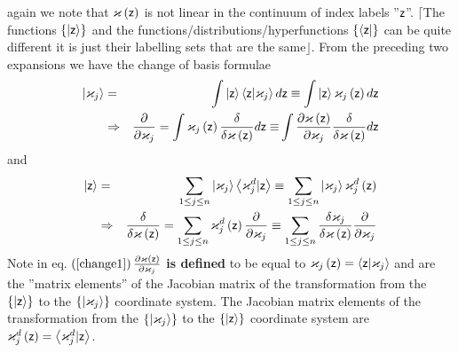 again we note that $\varkappa \left( {\sf z}\right) $ is not linear in the
continuum of index labels ''${\sf z}$''. $\lceil $The functions $\left\{
\left| {\sf z}\right\rangle \right\} $ and the
functions/distributions/hyperfunctions $\left\{ \left\langle {\sf z}\right|
\right\} $ can be quite different it is just their labelling sets that are
the same$\rfloor $. From the preceding two expansions we have the change of
basis formulae 
\begin{eqnarray}
\left| {\bf \varkappa }_{j}\right\rangle &=&\int \left| {\sf z}\right\rangle
\left\langle {\sf z}|{\bf \varkappa }_{j}\right\rangle d{\sf z}\equiv \int
\left| {\sf z}\right\rangle \varkappa _{j}\left( {\sf z}\right) d{\sf z} 
\nonumber \\
&\Rightarrow &\frac{\partial }{\partial \varkappa _{j}}=\int \varkappa
_{j}\left( {\sf z}\right) \frac{\delta }{\delta \varkappa \left( {\sf z}%
\right) }d{\sf z\equiv }\int \frac{\partial \varkappa \left( {\sf z}\right) 
}{\partial \varkappa _{j}}\frac{\delta }{\delta \varkappa \left( {\sf z}%
\right) }d{\sf z}  \label{change1}
\end{eqnarray}%
and%
\begin{eqnarray}
\left| {\sf z}\right\rangle &=&\sum_{1\leq j\leq n}\left| {\bf \varkappa }%
_{j}\right\rangle \left\langle {\bf \varkappa }_{j}^{d}|{\sf z}\right\rangle
\equiv \sum_{1\leq j\leq n}\left| {\bf \varkappa }_{j}\right\rangle
\varkappa _{j}^{d}\left( {\sf z}\right)  \nonumber \\
&\Rightarrow &\frac{\delta }{\delta \varkappa \left( {\sf z}\right) }%
=\sum_{1\leq j\leq n}\varkappa _{j}^{d}\left( {\sf z}\right) \frac{\partial 
}{\partial \varkappa _{j}}\equiv \sum_{1\leq j\leq n}\frac{\delta \varkappa
_{j}}{\delta \varkappa \left( {\sf z}\right) }\frac{\partial }{\partial
\varkappa _{j}}  \label{change2}
\end{eqnarray}%
Note in eq. $\left( \ref{change1}\right) \frac{\partial \varkappa \left( 
{\sf z}\right) }{\partial \varkappa _{j}}$ {\bf is defined }to be equal to $%
\varkappa _{j}\left( {\sf z}\right) =\left\langle {\sf z}|{\bf \varkappa }%
_{j}\right\rangle $ and are the ''matrix elements'' of the Jacobian matrix
of the transformation from the $\left\{ \left| {\sf z}\right\rangle \right\} 
$ to the $\left\{ \left| {\bf \varkappa }_{j}\right\rangle \right\} $
coordinate system. The Jacobian matrix elements of the transformation from
the $\left\{ \left| {\bf \varkappa }_{j}\right\rangle \right\} $ to the $%
\left\{ \left| {\sf z}\right\rangle \right\} $ coordinate system are $%
\varkappa _{j}^{d}\left( {\sf z}\right) =\left\langle {\bf \varkappa }%
_{j}^{d}|{\sf z}\right\rangle $.

